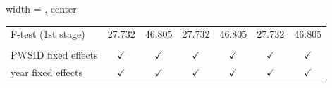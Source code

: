 \begin{table}[htbp]
\begin{adjustbox}{width = \textwidth, center}
\begin{tabular}{lcccccc}
         F-test (1st stage)                       & 27.732                          & 46.805             & 27.732                                & 46.805                   & 27.732                               & 46.805\\  
          \\
         PWSID fixed effects                      & $\checkmark$                    & $\checkmark$       & $\checkmark$                          & $\checkmark$             & $\checkmark$                         & $\checkmark$\\   
         year fixed effects                       & $\checkmark$                    & $\checkmark$       & $\checkmark$                          & $\checkmark$             & $\checkmark$                         & $\checkmark$\\   
         \bottomrule
      \end{tabular}
   \end{adjustbox}
\end{table}


